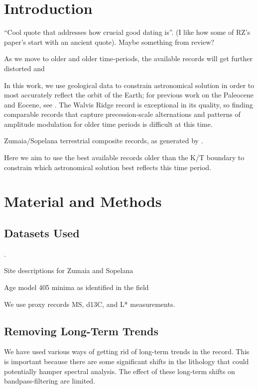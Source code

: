\documentclass[draft]{agujournal2019}
\begin{document}
\section{Introduction}\label{sec:intro}
``Cool quote that addresses how crucial good dating is''. (I like how some of
RZ's paper's start with an ancient quote). Maybe something from
 review?

As we move to older and older time-periods, the available records will get
further distorted and

In this work, we use geological data to constrain astronomical solution in
order to most accurately reflect the orbit of the Earth; for previous work on
the Paleocene and Eocene, see .
The Walvis Ridge record is exceptional in its quality, so finding comparable
records that capture precession-scale alternations and patterns of amplitude
modulation for older time periods is difficult at this time.

Zumaia/Sopelana terrestrial composite records, as generated by
.

Here we aim to use the best available records older than the K/T boundary to
constrain which astronomical solution best reflects this time period.


\section{Material and Methods}\label{sec:mm}

\subsection{Datasets Used}\label{sec:data}
.

Site descriptions for Zumaia and Sopelana

Age model \qty{405}{\kiloyear} minima as identified in the field

We use proxy records \gls{MS}, \gls{d13C}, and \gls{L*} measurements.

\subsection{Removing Long-Term Trends}\label{sec:detrend}

We have used various ways of getting rid of long-term trends in the record.
This is important because there are some significant shifts in the lithology
that could potentially hamper spectral analysis. The effect of these long-term
shifts on bandpass-filtering are limited.
\end{document}
